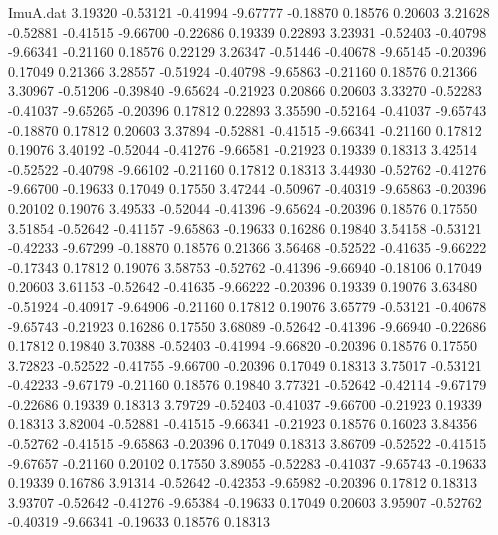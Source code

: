 \begin{filecontents}{ImuA.dat}
   3.19320   -0.53121   -0.41994   -9.67777   -0.18870    0.18576    0.20603
   3.21628   -0.52881   -0.41515   -9.66700   -0.22686    0.19339    0.22893
   3.23931   -0.52403   -0.40798   -9.66341   -0.21160    0.18576    0.22129
   3.26347   -0.51446   -0.40678   -9.65145   -0.20396    0.17049    0.21366
   3.28557   -0.51924   -0.40798   -9.65863   -0.21160    0.18576    0.21366
   3.30967   -0.51206   -0.39840   -9.65624   -0.21923    0.20866    0.20603
   3.33270   -0.52283   -0.41037   -9.65265   -0.20396    0.17812    0.22893
   3.35590   -0.52164   -0.41037   -9.65743   -0.18870    0.17812    0.20603
   3.37894   -0.52881   -0.41515   -9.66341   -0.21160    0.17812    0.19076
   3.40192   -0.52044   -0.41276   -9.66581   -0.21923    0.19339    0.18313
   3.42514   -0.52522   -0.40798   -9.66102   -0.21160    0.17812    0.18313
   3.44930   -0.52762   -0.41276   -9.66700   -0.19633    0.17049    0.17550
   3.47244   -0.50967   -0.40319   -9.65863   -0.20396    0.20102    0.19076
   3.49533   -0.52044   -0.41396   -9.65624   -0.20396    0.18576    0.17550
   3.51854   -0.52642   -0.41157   -9.65863   -0.19633    0.16286    0.19840
   3.54158   -0.53121   -0.42233   -9.67299   -0.18870    0.18576    0.21366
   3.56468   -0.52522   -0.41635   -9.66222   -0.17343    0.17812    0.19076
   3.58753   -0.52762   -0.41396   -9.66940   -0.18106    0.17049    0.20603
   3.61153   -0.52642   -0.41635   -9.66222   -0.20396    0.19339    0.19076
   3.63480   -0.51924   -0.40917   -9.64906   -0.21160    0.17812    0.19076
   3.65779   -0.53121   -0.40678   -9.65743   -0.21923    0.16286    0.17550
   3.68089   -0.52642   -0.41396   -9.66940   -0.22686    0.17812    0.19840
   3.70388   -0.52403   -0.41994   -9.66820   -0.20396    0.18576    0.17550
   3.72823   -0.52522   -0.41755   -9.66700   -0.20396    0.17049    0.18313
   3.75017   -0.53121   -0.42233   -9.67179   -0.21160    0.18576    0.19840
   3.77321   -0.52642   -0.42114   -9.67179   -0.22686    0.19339    0.18313
   3.79729   -0.52403   -0.41037   -9.66700   -0.21923    0.19339    0.18313
   3.82004   -0.52881   -0.41515   -9.66341   -0.21923    0.18576    0.16023
   3.84356   -0.52762   -0.41515   -9.65863   -0.20396    0.17049    0.18313
   3.86709   -0.52522   -0.41515   -9.67657   -0.21160    0.20102    0.17550
   3.89055   -0.52283   -0.41037   -9.65743   -0.19633    0.19339    0.16786
   3.91314   -0.52642   -0.42353   -9.65982   -0.20396    0.17812    0.18313
   3.93707   -0.52642   -0.41276   -9.65384   -0.19633    0.17049    0.20603
   3.95907   -0.52762   -0.40319   -9.66341   -0.19633    0.18576    0.18313

\end{filecontents}
